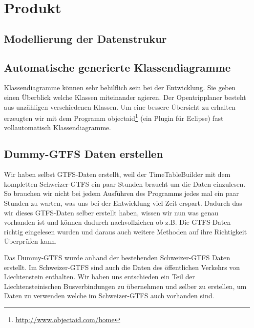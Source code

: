 \section{Produkt}



\subsection{Modellierung der Datenstrukur}

\subsection{Automatische generierte Klassendiagramme}
Klassendiagramme können sehr behilflich sein bei der Entwicklung. Sie geben einen Überblick welche Klassen miteinander agieren.
Der Opentripplaner besteht aus unzähligen verschiedenen Klassen. Um eine bessere Übersicht zu erhalten erzeugten wir mit dem Programm objectaid\footnote{\url{http://www.objectaid.com/home}} (ein Plugin für Eclipse) fast vollautomatisch Klassendiagramme. 

\subsection{Dummy-GTFS Daten erstellen}
Wir haben selbst GTFS-Daten erstellt, weil der TimeTableBuilder mit dem kompletten Schweizer-GTFS ein paar Stunden braucht um die Daten einzulesen. So brauchen wir nicht bei jedem Ausführen des Programms jedes mal ein paar Stunden zu warten, was uns bei der Entwicklung viel Zeit erspart. Dadurch das wir dieses GTFS-Daten selber erstellt haben, wissen wir nun was genau vorhanden ist und können dadurch nachvollziehen ob z.B. Die GTFS-Daten richtig eingelesen wurden und daraus auch weitere Methoden auf ihre Richtigkeit Überprüfen kann.\newline

Das Dummy-GTFS wurde anhand der bestehenden Schweizer-GTFS Daten erstellt. Im Schweizer-GTFS sind auch die Daten des öffentlichen Verkehrs von Liechtenstein enthalten. Wir haben uns entschieden ein Teil der Liechtensteinischen Busverbindungen zu übernehmen und selber zu erstellen, um Daten zu verwenden welche im Schweizer-GTFS auch vorhanden sind.

